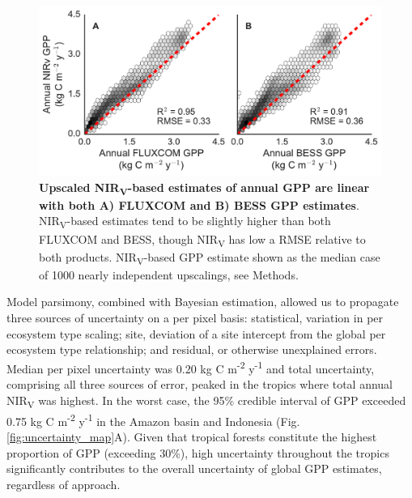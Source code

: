 \documentclass[10pt,letterpaper]{article}
\begin{document}
\begin{figure}
    \centering
    \includegraphics[width=11.4cm, keepaspectratio]{figure_bess_fluxcom_area.pdf}
    \caption{\textbf{Upscaled NIR\textsubscript{V}-based estimates of annual GPP are linear with both A) FLUXCOM and B) BESS GPP estimates}.  NIR\textsubscript{V}-based estimates tend to be slightly higher than both FLUXCOM and BESS, though NIR\textsubscript{V} has low a RMSE relative to both products. NIR\textsubscript{V}-based GPP estimate shown as the median case of 1000 nearly independent upscalings, see Methods. }
    \label{fig:bess_fluxcom}
\end{figure}

Model parsimony, combined with Bayesian estimation, allowed us to propagate three sources of uncertainty on a per pixel basis: statistical, variation in per ecosystem type scaling; site, deviation of a site intercept from the global per ecosystem type relationship; and residual, or otherwise unexplained errors. Median per pixel uncertainty was 0.20 kg C m\textsuperscript{-2} y\textsuperscript{-1} and total uncertainty, comprising all three sources of error, peaked in the tropics where total annual NIR\textsubscript{V} was highest. In the worst case, the 95\% credible interval of GPP exceeded 0.75 kg C m\textsuperscript{-2} y\textsuperscript{-1} in the Amazon basin and Indonesia (Fig. \ref{fig:uncertainty_map}A). Given that tropical forests constitute the highest proportion of GPP (exceeding 30\%), high uncertainty throughout the tropics significantly contributes to the overall uncertainty of global GPP estimates, regardless of approach. 
\end{document}
